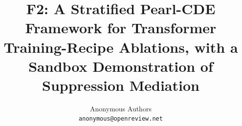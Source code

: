 \documentclass[10pt]{article}
\title{F2: A Stratified Pearl-CDE Framework for Transformer
Training-Recipe Ablations, with a Sandbox Demonstration of
Suppression Mediation}
\author{Anonymous Authors\\
\texttt{anonymous@openreview.net}}
\begin{document}
\maketitle



\nocite{vanderweele2017evalue, vaswani2017attention, loshchilov2019adamw,
  daniel2015biom, guo2026sim, haneuse2019jama, fostiropoulos2023ablator,
  meng2022rome, wang2023activation}



\end{document}
